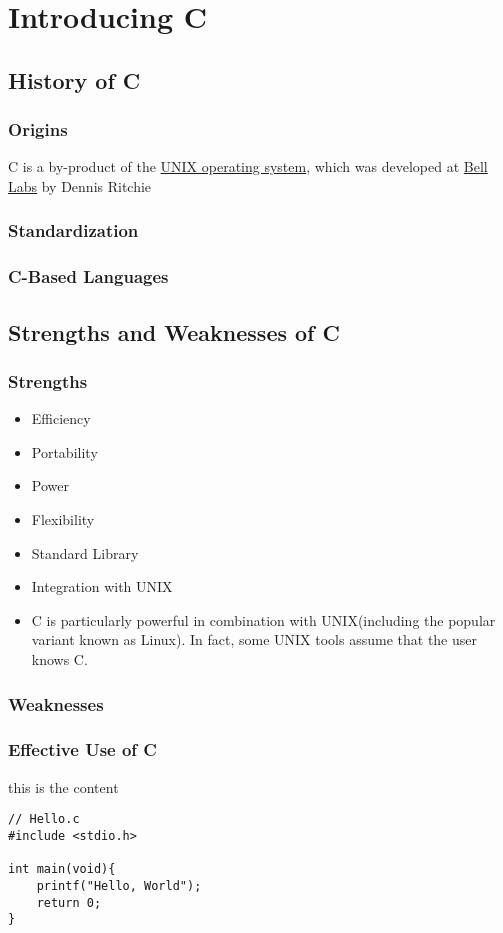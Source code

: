 \documentclass[../main.tex]{subfiles}
\begin{document}
\section{Introducing C}

\subsection{History of C}
\subsubsection*{Origins}

C is a by-product of the 
\href{https://en.wikipedia.org/wiki/Unix}{UNIX operating system},
which was developed at
\href{ttps://en.wikipedia.org/wiki/Bell_Labs}{Bell Labs}
by Dennis Ritchie


\subsubsection*{Standardization}
\subsubsection*{C-Based Languages}


\subsection{Strengths and Weaknesses of C}
\subsubsection*{Strengths}

\begin{itemize}
    \item Efficiency
    \item Portability
    \item Power
    \item Flexibility
    \item Standard Library
    \item Integration with UNIX
    \item C is particularly powerful in combination with UNIX(including the popular variant known as Linux). In fact, some UNIX tools assume that the user knows C.
\end{itemize}

\subsubsection*{Weaknesses}
\subsubsection*{Effective Use of C}


this is the content

\begin{lstlisting}
// Hello.c
#include <stdio.h>

int main(void){
    printf("Hello, World");
    return 0;
}
\end{lstlisting}
\end{document}
